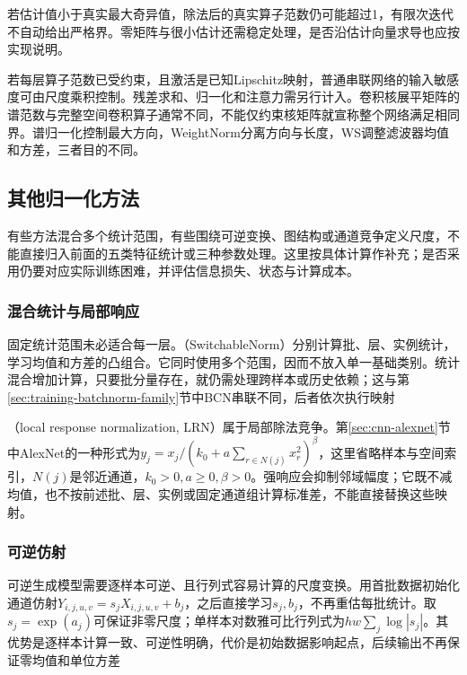若估计值小于真实最大奇异值，除法后的真实算子范数仍可能超过1，有限次迭代不自动给出严格界。零矩阵与很小估计还需稳定处理，是否沿估计向量求导也应按实现说明。

若每层算子范数已受约束，且激活是已知Lipschitz映射，普通串联网络的输入敏感度可由尺度乘积控制。残差求和、归一化和注意力需另行计入。卷积核展平矩阵的谱范数与完整空间卷积算子通常不同，不能仅约束核矩阵就宣称整个网络满足相同界。谱归一化控制最大方向，WeightNorm分离方向与长度，WS调整滤波器均值和方差，三者目的不同。

\subsection{其他归一化方法}
\label{sec:training-other-normalization}
有些方法混合多个统计范围，有些围绕可逆变换、图结构或通道竞争定义尺度，不能直接归入前面的五类特征统计或三种参数处理。这里按具体计算作补充；是否采用仍要对应实际训练困难，并评估信息损失、状态与计算成本。

\subsubsection{混合统计与局部响应}
\label{sec:training-normalization-combinations}
\label{sec:training-switchable-bcn}
固定统计范围未必适合每一层。（SwitchableNorm）分别计算批、层、实例统计，学习均值和方差的凸组合。它同时使用多个范围，因而不放入单一基础类别。统计混合增加计算，只要批分量存在，就仍需处理跨样本或历史依赖；这与第\ref{sec:training-batchnorm-family}节中BCN串联不同，后者依次执行映射

（local response normalization, LRN）属于局部除法竞争。第\ref{sec:cnn-alexnet}节中AlexNet的一种形式为$y_j=x_j/(k_0+a\sum_{r\in N(j)}x_r^2)^\beta$，这里省略样本与空间索引，$N(j)$是邻近通道，$k_0>0,a\geq0,\beta>0$。强响应会抑制邻域幅度；它既不减均值，也不按前述批、层、实例或固定通道组计算标准差，不能直接替换这些映射。

\subsubsection{可逆仿射}
\label{sec:training-actnorm}
可逆生成模型需要逐样本可逆、且行列式容易计算的尺度变换。用首批数据初始化通道仿射$Y_{i,j,u,v}=s_jX_{i,j,u,v}+b_j$，之后直接学习$s_j,b_j$，不再重估每批统计。取$s_j=\exp(a_j)$可保证非零尺度；单样本对数雅可比行列式为$hw\sum_j\log|s_j|$。其优势是逐样本计算一致、可逆性明确，代价是初始数据影响起点，后续输出不再保证零均值和单位方差

